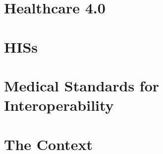 \section{Healthcare 4.0}

\section{\aclp{HIS}}

\section{Medical Standards for Interoperability}

\section{The \ausl{} Context}
